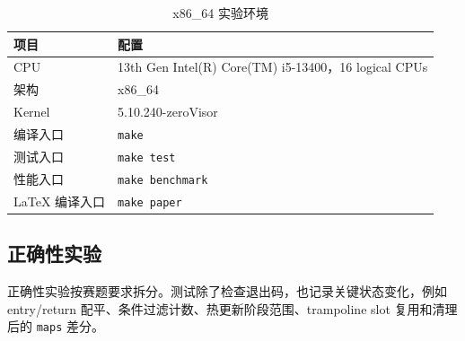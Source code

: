 \documentclass[UTF8,a4paper,11pt,fontset=fandol]{ctexart}
\newcommand{\code}[1]{\texttt{#1}}
\begin{document}
\begin{table}[H]
\centering
\caption{x86\_64 实验环境}
\label{tab:env}
\begin{tabularx}{\textwidth}{P{4.2cm}Y}
\toprule
\textbf{项目} & \textbf{配置}\\
\midrule
CPU & 13th Gen Intel(R) Core(TM) i5-13400，16 logical CPUs\\
架构 & x86\_64\\
Kernel & 5.10.240-zeroVisor\\
编译入口 & \code{make}\\
测试入口 & \code{make test}\\
性能入口 & \code{make benchmark}\\
LaTeX 编译入口 & \code{make paper}\\
\bottomrule
\end{tabularx}
\end{table}

\subsection{正确性实验}

正确性实验按赛题要求拆分。测试除了检查退出码，也记录关键状态变化，例如 entry/return 配平、条件过滤计数、热更新阶段范围、trampoline slot 复用和清理后的 \code{maps} 差分。
\end{document}
